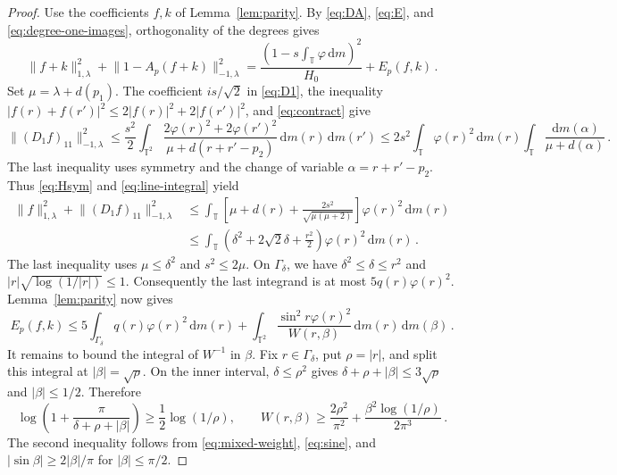 \documentclass[11pt]{amsart}
\theoremstyle{plain}
\theoremstyle{definition}
\newcommand{\T}{\mathbb T}
\newcommand{\1}{\mathbf 1}
\newcommand{\norm}[1]{\lVert #1\rVert}
\newcommand{\abs}[1]{\lvert #1\rvert}
\newcommand{\dd}{\,\mathrm d}
\newcommand{\Hminus}[1]{\norm{#1}_{-1,\lambda}}
\newcommand{\Hplus}[1]{\norm{#1}_{1,\lambda}}
\begin{document}
\begin{proof}
Use the coefficients $f,k$ of Lemma~\ref{lem:parity}.
By \eqref{eq:DA}, \eqref{eq:E}, and \eqref{eq:degree-one-images},
orthogonality of the degrees gives
\begin{equation}\label{eq:uncancelled}
  \Hplus{f+k}^2+\Hminus{1-A_p(f+k)}^2
  =\frac{\left(1-s\int_\T\varphi\dd m\right)^2}{H_0}+E_p(f,k)\, .
\end{equation}
Set $\mu=\lambda+d(p_1)$.
The coefficient $is/\sqrt2$ in \eqref{eq:D1}, the inequality
$\abs{f(r)+f(r')}^2\leq2\abs{f(r)}^2+2\abs{f(r')}^2$, and
\eqref{eq:contract} give
\[
  \Hminus{(D_1f)_{11}}^2
  \leq\frac{s^2}{2}\int_{\T^2}
  \frac{2\varphi(r)^2+2\varphi(r')^2}
       {\mu+d(r+r'-p_2)}\dd m(r)\dd m(r')
  \leq2s^2\int_\T\varphi(r)^2\dd m(r)
  \int_\T\frac{\dd m(\alpha)}{\mu+d(\alpha)}\, .
\]
The last inequality uses symmetry and the change of variable
$\alpha=r+r'-p_2$.  Thus \eqref{eq:Hsym} and \eqref{eq:line-integral} yield
\begin{equation}\label{eq:degree-one-cost}
\begin{split}
  \Hplus f^2+\Hminus{(D_1f)_{11}}^2
  &\leq\int_\T\left[\mu+d(r)+
    \frac{2s^2}{\sqrt{\mu(\mu+2)}}\right]\varphi(r)^2\dd m(r)\\
  &\leq\int_\T\left(\delta^2+2\sqrt2\delta+\frac{r^2}{2}\right)
    \varphi(r)^2\dd m(r)\, .
\end{split}
\end{equation}
The last inequality uses $\mu\leq\delta^2$ and $s^2\leq2\mu$.
On $\Gamma_\delta$, we have $\delta^2\leq\delta\leq r^2$ and
$\abs r\sqrt{\log(1/\abs r)}\leq1$.
Consequently the last integrand is at most $5q(r)\varphi(r)^2$.
Lemma~\ref{lem:parity} now gives
\begin{equation}\label{eq:energy-reduction}
  E_p(f,k)\leq5\int_{\Gamma_\delta}q(r)\varphi(r)^2\dd m(r)
  +\int_{\T^2}\frac{\sin^2r\varphi(r)^2}{W(r,\beta)}
  \dd m(r)\dd m(\beta)\, .
\end{equation}
It remains to bound the integral of $W^{-1}$ in $\beta$.
Fix $r\in\Gamma_\delta$, put $\rho=\abs r$, and split this integral at
$\abs\beta=\sqrt\rho$.
On the inner interval, $\delta\leq\rho^2$ gives
$\delta+\rho+\abs\beta\leq3\sqrt\rho$ and
$\abs\beta\leq1/2$.  Therefore
\[
  \log\left(1+\frac\pi{\delta+\rho+\abs\beta}\right)
  \geq\frac12\log(1/\rho),\qquad
  W(r,\beta)\geq\frac{2\rho^2}{\pi^2}
    +\frac{\beta^2\log(1/\rho)}{2\pi^3}\, .
\]
The second inequality follows from \eqref{eq:mixed-weight},
\eqref{eq:sine}, and $\abs{\sin\beta}\geq2\abs\beta/\pi$
for $\abs\beta\leq\pi/2$.

\end{proof}
\end{document}
